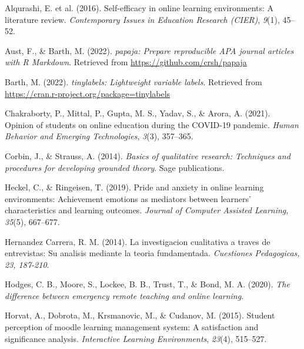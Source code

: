 \documentclass[
  man]{apa6}
\newlength{\cslhangindent}
\newlength{\cslentryspacingunit} %
\newenvironment{CSLReferences}[2] %
 {%
  \setlength{\parindent}{0pt}
  \ifodd #1
  \let\oldpar\par
  \def\par{\hangindent=\cslhangindent\oldpar}
  \fi
  \setlength{\parskip}{#2\cslentryspacingunit}
 }%
 {}
\begin{document}
\hypertarget{refs}{}
\begin{CSLReferences}{1}{0}
\leavevmode{}%
Alqurashi, E. et al. (2016). Self-efficacy in online learning environments: A literature review. \emph{Contemporary Issues in Education Research (CIER)}, \emph{9}(1), 45--52.

\leavevmode{}%
Aust, F., \& Barth, M. (2022). \emph{{papaja}: {Prepare} reproducible {APA} journal articles with {R Markdown}}. Retrieved from \url{https://github.com/crsh/papaja}

\leavevmode{}%
Barth, M. (2022). \emph{{tinylabels}: Lightweight variable labels}. Retrieved from \url{https://cran.r-project.org/package=tinylabels}

\leavevmode{}%
Chakraborty, P., Mittal, P., Gupta, M. S., Yadav, S., \& Arora, A. (2021). Opinion of students on online education during the COVID-19 pandemic. \emph{Human Behavior and Emerging Technologies}, \emph{3}(3), 357--365.

\leavevmode{}%
Corbin, J., \& Strauss, A. (2014). \emph{Basics of qualitative research: Techniques and procedures for developing grounded theory}. Sage publications.

\leavevmode{}%
Heckel, C., \& Ringeisen, T. (2019). Pride and anxiety in online learning environments: Achievement emotions as mediators between learners' characteristics and learning outcomes. \emph{Journal of Computer Assisted Learning}, \emph{35}(5), 667--677.

\leavevmode{}%
Hernandez Carrera, R. M. (2014). La investigacion cualitativa a trav{e}s de entrevistas: Su analisis mediante la teoria fundamentada. \emph{Cuestiones Pedagogicas, 23, 187-210}.

\leavevmode{}%
Hodges, C. B., Moore, S., Lockee, B. B., Trust, T., \& Bond, M. A. (2020). \emph{The difference between emergency remote teaching and online learning}.

\leavevmode{}%
Horvat, A., Dobrota, M., Krsmanovic, M., \& Cudanov, M. (2015). Student perception of moodle learning management system: A satisfaction and significance analysis. \emph{Interactive Learning Environments}, \emph{23}(4), 515--527.


\end{CSLReferences}
\end{document}

